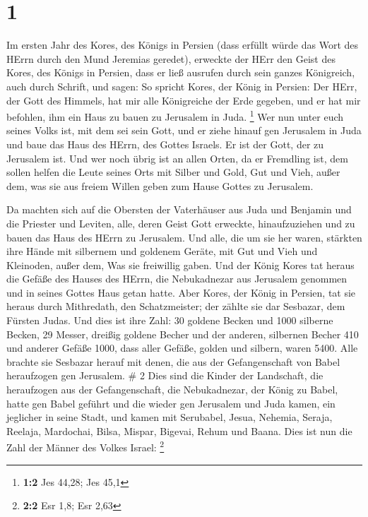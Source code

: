 \hypertarget{section}{%
\section{1}\label{section}}

 Im ersten Jahr des Kores, des Königs in Persien (dass
erfüllt würde das Wort des HErrn durch den Mund Jeremias geredet),
erweckte der HErr den Geist des Kores, des Königs in Persien, dass er
ließ ausrufen durch sein ganzes Königreich, auch durch Schrift, und
sagen:  So spricht Kores, der König in Persien: Der HErr,
der Gott des Himmels, hat mir alle Königreiche der Erde gegeben, und er
hat mir befohlen, ihm ein Haus zu bauen zu Jerusalem in Juda.
\footnote{\textbf{1:2} Jes 44,28; Jes 45,1}  Wer nun unter
euch seines Volks ist, mit dem sei sein Gott, und er ziehe hinauf gen
Jerusalem in Juda und baue das Haus des HErrn, des Gottes Israels. Er
ist der Gott, der zu Jerusalem ist.  Und wer noch übrig ist
an allen Orten, da er Fremdling ist, dem sollen helfen die Leute seines
Orts mit Silber und Gold, Gut und Vieh, außer dem, was sie aus freiem
Willen geben zum Hause Gottes zu Jerusalem.

 Da machten sich auf die Obersten der Vaterhäuser aus Juda
und Benjamin und die Priester und Leviten, alle, deren Geist Gott
erweckte, hinaufzuziehen und zu bauen das Haus des HErrn zu Jerusalem.
 Und alle, die um sie her waren, stärkten ihre Hände mit
silbernem und goldenem Geräte, mit Gut und Vieh und Kleinoden, außer
dem, Was sie freiwillig gaben.  Und der König Kores tat
heraus die Gefäße des Hauses des HErrn, die Nebukadnezar aus Jerusalem
genommen und in seines Gottes Haus getan hatte.  Aber Kores,
der König in Persien, tat sie heraus durch Mithredath, den
Schatzmeister; der zählte sie dar Sesbazar, dem Fürsten Judas.
 Und dies ist ihre Zahl: 30 goldene Becken und 1000 silberne
Becken, 29 Messer,  dreißig goldene Becher und der anderen,
silbernen Becher 410 und anderer Gefäße 1000,  dass aller
Gefäße, golden und silbern, waren 5400. Alle brachte sie Sesbazar herauf
mit denen, die aus der Gefangenschaft von Babel heraufzogen gen
Jerusalem. \# 2  Dies sind die Kinder der Landschaft, die
heraufzogen aus der Gefangenschaft, die Nebukadnezar, der König zu
Babel, hatte gen Babel geführt und die wieder gen Jerusalem und Juda
kamen, ein jeglicher in seine Stadt,  und kamen mit
Serubabel, Jesua, Nehemia, Seraja, Reelaja, Mardochai, Bilsa, Mispar,
Bigevai, Rehum und Baana. Dies ist nun die Zahl der Männer des Volkes
Israel: \footnote{\textbf{2:2} Esr 1,8; Esr 2,63}

